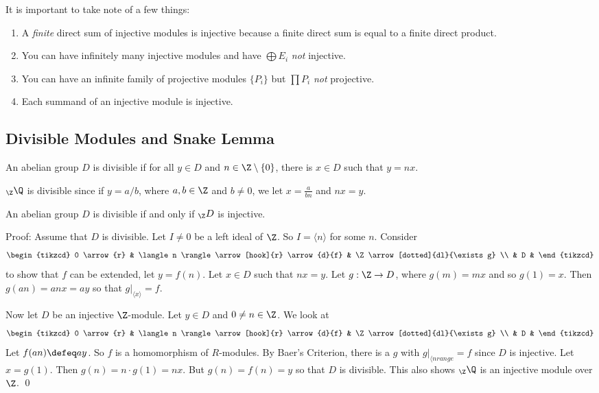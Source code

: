 It is important to take note of a few things:
\begin{enumerate}[1.]
\item A \emph{finite} direct sum of injective modules is injective because a finite direct sum is equal to a finite direct product. 
\item You can have infinitely many injective modules and have $\bigoplus E_i$ \emph{not} injective.
\item You can have an infinite family of projective modules $\{P_i\}$ but $\prod P_i$ \emph{not} projective. 
\item Each summand of an injective module is injective. 
\end{enumerate}



\subsection{Divisible Modules and Snake Lemma}

\begin{dfn}
An abelian group $D$ is divisible if for all $y \in D$ and $n \in \Z \setminus \{0\}$, there is $x \in D$ such that $y=nx$. 
\end{dfn}

\begin{ex}
$_\Z \Q$ is divisible since if $y=a/b$, where $a,b \in \Z$ and $b \neq 0$, we let $x=\frac{a}{bn}$ and $nx=y$.
\end{ex}

\begin{prop}
An abelian group $D$ is divisible if and only if $_\Z D$ is injective. 
\end{prop}

Proof: Assume that $D$ is divisible. Let $I \neq 0$ be a left ideal of $\Z$. So $I=\langle n \rangle$ for some $n$. Consider
\[
\begin{tikzcd}
0 \arrow{r} & \langle n \rangle \arrow[hook]{r} \arrow{d}{f} & \Z \arrow[dotted]{dl}{\exists g} \\
& D & 
\end{tikzcd}
\]
to show that $f$ can be extended, let $y=f(n)$. Let $x \in D$ such that $nx=y$. Let $g: \Z \rightarrow D$, where $g(m)=mx$ and so $g(1)=x$. Then $g(an)=anx=ay$ so that $g|_{\langle x \rangle}=f$. 

Now let $D$ be an injective $\Z$-module. Let $y \in D$ and $0 \neq n \in \Z$. We look at
\[
\begin{tikzcd}
0 \arrow{r} & \langle n \rangle \arrow[hook]{r} \arrow{d}{f} & \Z \arrow[dotted]{dl}{\exists g} \\
& D & 
\end{tikzcd}
\]
Let $f(an) \defeq ay$. So $f$ is a homomorphism of $R$-modules. By Baer's Criterion, there is a $g$ with $g|_{\langle n range}=f$ since $D$ is injective. Let $x=g(1)$. Then $g(n)=n \cdot g(1)=nx$. But $g(n)=f(n)=y$ so that $D$ is divisible. This also shows $_\Z \Q$ is an injective module over $\Z$. \qed \\

